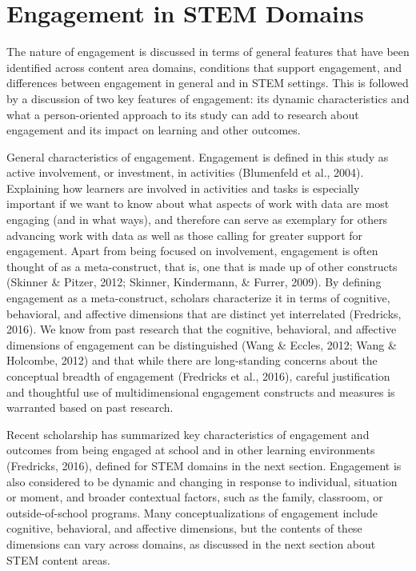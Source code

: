 \documentclass[]{msu-thesis}
\theoremstyle{definition}
\theoremstyle{definition}
\theoremstyle{definition}
\theoremstyle{remark}
\begin{document}
\section{Engagement in STEM Domains}\label{engagement-in-stem-domains}

The nature of engagement is discussed in terms of general features that
have been identified across content area domains, conditions that
support engagement, and differences between engagement in general and in
STEM settings. This is followed by a discussion of two key features of
engagement: its dynamic characteristics and what a person-oriented
approach to its study can add to research about engagement and its
impact on learning and other outcomes.

General characteristics of engagement. Engagement is defined in this
study as active involvement, or investment, in activities (Blumenfeld et
al., 2004). Explaining how learners are involved in activities and tasks
is especially important if we want to know about what aspects of work
with data are most engaging (and in what ways), and therefore can serve
as exemplary for others advancing work with data as well as those
calling for greater support for engagement. Apart from being focused on
involvement, engagement is often thought of as a meta-construct, that
is, one that is made up of other constructs (Skinner \& Pitzer, 2012;
Skinner, Kindermann, \& Furrer, 2009). By defining engagement as a
meta-construct, scholars characterize it in terms of cognitive,
behavioral, and affective dimensions that are distinct yet interrelated
(Fredricks, 2016). We know from past research that the cognitive,
behavioral, and affective dimensions of engagement can be distinguished
(Wang \& Eccles, 2012; Wang \& Holcombe, 2012) and that while there are
long-standing concerns about the conceptual breadth of engagement
(Fredricks et al., 2016), careful justification and thoughtful use of
multidimensional engagement constructs and measures is warranted based
on past research.

Recent scholarship has summarized key characteristics of engagement and
outcomes from being engaged at school and in other learning environments
(Fredricks, 2016), defined for STEM domains in the next section.
Engagement is also considered to be dynamic and changing in response to
individual, situation or moment, and broader contextual factors, such as
the family, classroom, or outside-of-school programs. Many
conceptualizations of engagement include cognitive, behavioral, and
affective dimensions, but the contents of these dimensions can vary
across domains, as discussed in the next section about STEM content
areas.
\end{document}
